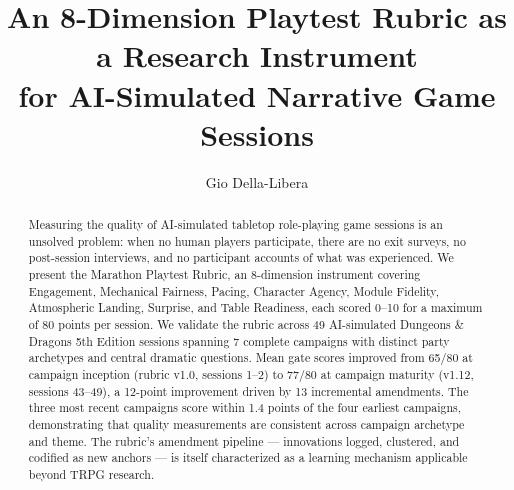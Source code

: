 \documentclass[sigconf]{acmart}
\begin{document}
\title{An 8-Dimension Playtest Rubric as a Research Instrument\\
       for AI-Simulated Narrative Game Sessions}

\author{Gio Della-Libera}

\begin{abstract}
Measuring the quality of AI-simulated tabletop role-playing game sessions is an
unsolved problem: when no human players participate, there are no exit surveys, no
post-session interviews, and no participant accounts of what was experienced. We
present the Marathon Playtest Rubric, an 8-dimension instrument covering Engagement,
Mechanical Fairness, Pacing, Character Agency, Module Fidelity, Atmospheric Landing,
Surprise, and Table Readiness, each scored 0--10 for a maximum of 80 points per
session. We validate the rubric across 49 AI-simulated Dungeons \& Dragons 5th
Edition sessions spanning 7 complete campaigns with distinct party archetypes and
central dramatic questions. Mean gate scores improved from 65/80 at campaign
inception (rubric v1.0, sessions 1--2) to 77/80 at campaign maturity (v1.12,
sessions 43--49), a 12-point improvement driven by 13 incremental amendments. The
three most recent campaigns score within 1.4 points of the four earliest campaigns,
demonstrating that quality measurements are consistent across campaign archetype and
theme. The rubric's amendment pipeline --- innovations logged, clustered, and
codified as new anchors --- is itself characterized as a learning mechanism applicable
beyond TRPG research.
\end{abstract}


\maketitle










\end{document}
